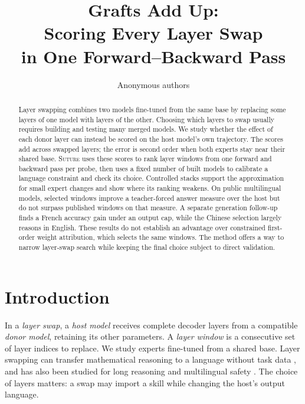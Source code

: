 \documentclass{article}
\title{\bf Grafts Add Up:\\ Scoring Every Layer Swap\\ in One Forward--Backward Pass}
\author{Anonymous authors}
\date{}
\theoremstyle{plain}
\theoremstyle{definition}
\theoremstyle{remark}
\begin{document}
\maketitle

\begin{abstract}
Layer swapping combines two models fine-tuned from the same base by replacing
some layers of one model with layers of the other. Choosing which layers to swap
usually requires building and testing many merged models. We study whether the
effect of each donor layer can instead be scored on the host model's own
trajectory. The scores add across swapped layers; the error is second order
when both experts stay near their shared base. \textsc{Suture} uses these scores to rank layer windows from
one forward and backward pass per probe, then uses a fixed number of built
models to calibrate a language constraint and check its choice. Controlled
stacks support the approximation for small expert changes and show where its
ranking weakens. On public multilingual models, selected windows improve a
teacher-forced answer measure over the host but do not surpass published
windows on that measure. A separate generation follow-up finds a French
accuracy gain under an output cap, while the Chinese selection largely reasons
in English. These results do not establish an advantage over constrained first-order
weight attribution, which selects the same windows.
The method offers a way to narrow layer-swap search while keeping the final
choice subject to direct validation.
\end{abstract}

\section{Introduction}

In a \emph{layer swap}, a \emph{host model} receives complete decoder layers
from a compatible \emph{donor model}, retaining its other parameters. A
\emph{layer window} is a consecutive set of layer indices to replace. We study
experts fine-tuned from a shared base. Layer swapping can transfer mathematical
reasoning to a language without task data \citep{bandarkar2025layerswap}, and
has also been studied for long reasoning and multilingual safety
\citep{lasbordes2026rethinking,shin2026safetyswap}. The choice of layers matters:
a swap may import a skill while changing the host's output language.
\end{document}
